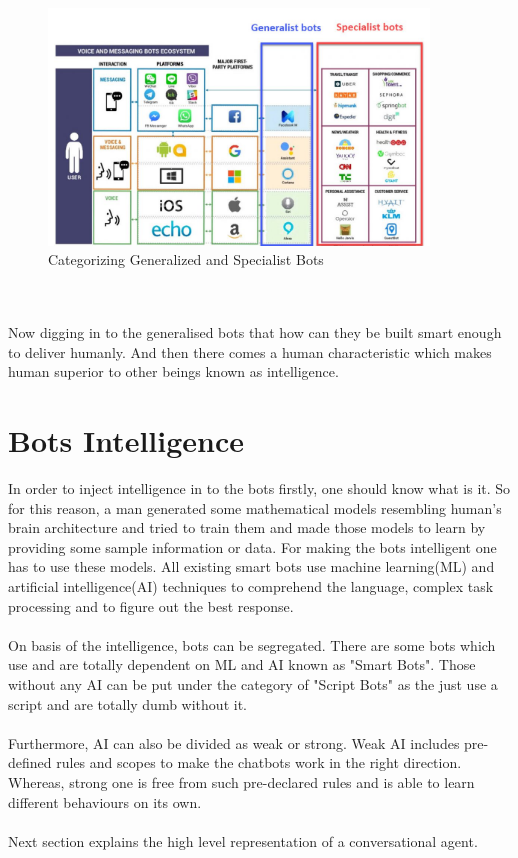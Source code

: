 \begin{figure}[h]
    \centering
    \includegraphics[width=0.9\textwidth]{img/generalist-vs-specialist.jpg}
    \caption{Categorizing Generalized and Specialist Bots \cite{botnerds}}
    \label{fig:ann}
\end{figure}
\\~\\
Now digging in to the generalised bots that how can they be built smart enough to deliver humanly. And then there comes a human characteristic which makes human superior to other beings known as intelligence.

\section{Bots Intelligence}
In order to inject intelligence in to the bots firstly, one should know what is it. So for this reason, a man generated some mathematical models resembling human's brain architecture and tried to train them and made those models to learn by providing some sample information or data. For making the bots intelligent one has to use these models. All existing smart bots use machine learning(ML) and artificial intelligence(AI) techniques to comprehend the language, complex task processing and to figure out the best response. \cite{botnerds}
\\~\\
On basis of the intelligence, bots can be segregated. There are some bots which use and are totally dependent on ML and AI known as "Smart Bots". Those without any AI can be put under the category of "Script Bots" as the just use a script and are totally dumb without it. \cite{botnerds}
\\~\\
Furthermore, AI can also be divided as weak or strong. Weak AI includes pre-defined rules and scopes to make the chatbots work in the right direction. Whereas, strong one is free from such pre-declared rules and is able to learn different behaviours on its own. \cite{CreatingChatbotsToTalk}
\\~\\
Next section explains the high level representation of a conversational agent. 


